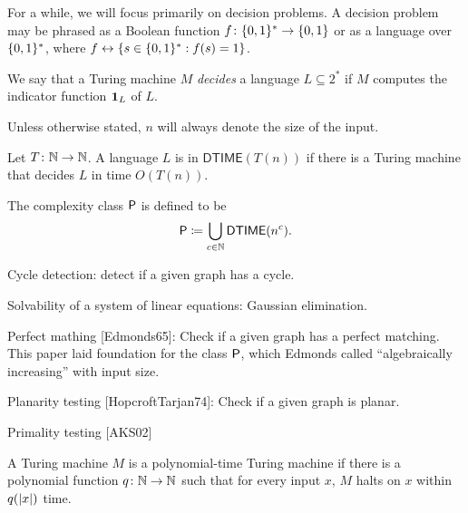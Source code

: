 For a while, we will focus primarily on decision problems.
A decision problem may be phrased as a Boolean function
$f\colon \{0, 1\}^* \to \{0, 1\}$ or as a language over $\{0, 1\}^*$,
where $f \leftrightarrow \{s \in \{0, 1\}^* : f(s) = 1\}$.
\begin{definition}[Decision] \label{def:decision}
    We say that a Turing machine $M$ \emph{decides} a language
    $L \subseteq 2^*$ if $M$ computes the indicator function $\mathbf{1}_L$ of $L$.
\end{definition}

Unless otherwise stated, $n$ will always denote the size of the input.
\begin{definition}[$\P$] \label{def:P}
    Let $T\colon \mathbb{N} \to \mathbb{N}$.
    A language $L$ is in $\mathsf{DTIME}(T(n))$ if there is a Turing machine
    that decides $L$ in time $O(T(n))$.

    The complexity class $\P$ is defined to be \[
        \mathsf{P} \coloneq \bigcup_{c \in \mathbb{N}} \mathsf{DTIME}(n^c).
    \]
\end{definition}
\begin{examples}
    \item Cycle detection: detect if a given graph has a cycle.
    \item Solvability of a system of linear equations: Gaussian elimination.
    \item Perfect mathing [Edmonds65]: Check if a given graph has a perfect
        matching.
        This paper laid foundation for the class $\P$, which Edmonds called
        ``algebraically increasing'' with input size.
    \item Planarity testing [HopcroftTarjan74]: Check if a given graph is
        planar.
    \item Primality testing [AKS02]
\end{examples}

\begin{definition} \label{def:polynomial-time}
    A Turing machine $M$ is a polynomial-time Turing machine if there is a
    polynomial function $q\colon \mathbb{N} \to \mathbb{N}$ such that for every input $x$,
    $M$ halts on $x$ within $q(\lvert x\rvert)$ time.
\end{definition}

